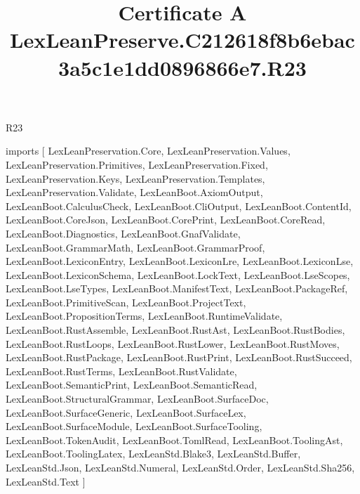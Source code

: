 \begin{lexlean}{R23}
\title{Certificate A LexLeanPreserve.C212618f8b6ebac3a5c1e1dd0896866e7.R23}
\begin{coremodule}
imports [
  LexLeanPreservation.Core,
  LexLeanPreservation.Values,
  LexLeanPreservation.Primitives,
  LexLeanPreservation.Fixed,
  LexLeanPreservation.Keys,
  LexLeanPreservation.Templates,
  LexLeanPreservation.Validate,
  LexLeanBoot.AxiomOutput,
  LexLeanBoot.CalculusCheck,
  LexLeanBoot.CliOutput,
  LexLeanBoot.ContentId,
  LexLeanBoot.CoreJson,
  LexLeanBoot.CorePrint,
  LexLeanBoot.CoreRead,
  LexLeanBoot.Diagnostics,
  LexLeanBoot.GnafValidate,
  LexLeanBoot.GrammarMath,
  LexLeanBoot.GrammarProof,
  LexLeanBoot.LexiconEntry,
  LexLeanBoot.LexiconLre,
  LexLeanBoot.LexiconLse,
  LexLeanBoot.LexiconSchema,
  LexLeanBoot.LockText,
  LexLeanBoot.LseScopes,
  LexLeanBoot.LseTypes,
  LexLeanBoot.ManifestText,
  LexLeanBoot.PackageRef,
  LexLeanBoot.PrimitiveScan,
  LexLeanBoot.ProjectText,
  LexLeanBoot.PropositionTerms,
  LexLeanBoot.RuntimeValidate,
  LexLeanBoot.RustAssemble,
  LexLeanBoot.RustAst,
  LexLeanBoot.RustBodies,
  LexLeanBoot.RustLoops,
  LexLeanBoot.RustLower,
  LexLeanBoot.RustMoves,
  LexLeanBoot.RustPackage,
  LexLeanBoot.RustPrint,
  LexLeanBoot.RustSucceed,
  LexLeanBoot.RustTerms,
  LexLeanBoot.RustValidate,
  LexLeanBoot.SemanticPrint,
  LexLeanBoot.SemanticRead,
  LexLeanBoot.StructuralGrammar,
  LexLeanBoot.SurfaceDoc,
  LexLeanBoot.SurfaceGeneric,
  LexLeanBoot.SurfaceLex,
  LexLeanBoot.SurfaceModule,
  LexLeanBoot.SurfaceTooling,
  LexLeanBoot.TokenAudit,
  LexLeanBoot.TomlRead,
  LexLeanBoot.ToolingAst,
  LexLeanBoot.ToolingLatex,
  LexLeanStd.Blake3,
  LexLeanStd.Buffer,
  LexLeanStd.Json,
  LexLeanStd.Numeral,
  LexLeanStd.Order,
  LexLeanStd.Sha256,
  LexLeanStd.Text
]


\end{coremodule}
\end{lexlean}
